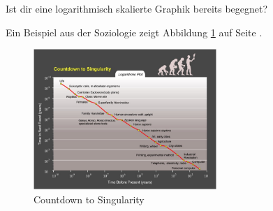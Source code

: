 \documentclass[%
11pt,%
twoside,%
titlepage,%
german,%
headsepline%
]{scrartcl}
\begin{document}
\begin{ueb}
Ist dir eine logarithmisch skalierte Graphik bereits begegnet?
\end{ueb}
Ein Beispiel aus der Soziologie zeigt Abbildung \ref{sozlog} auf Seite \pageref{sozlog}.
\begin{figure}
\begin{center}
\includegraphics[width=0.618\textwidth]{pictures/sozlog}
\end{center}
\caption{Countdown to Singularity}\label{sozlog}
\end{figure}

\listoffigures
%
%
\end{document}
